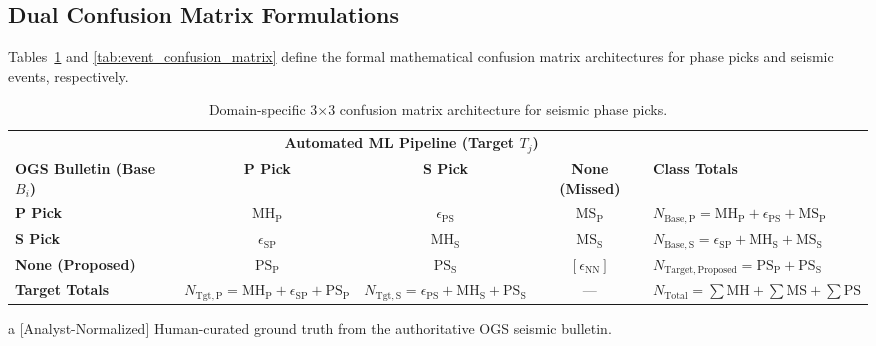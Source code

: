 \subsection{Dual Confusion Matrix Formulations}
Tables~\ref{tab:pick_confusion_matrix} and \ref{tab:event_confusion_matrix} define the formal mathematical confusion matrix architectures for phase picks and seismic events, respectively.

\begin{table}[htbp]
  \centering
  \small
  \caption{Domain-specific 3$\times$3 confusion matrix architecture for seismic phase picks.}
  \label{tab:pick_confusion_matrix}
  \begin{threeparttable}
    \begin{tabularx}{\linewidth}{l c c c X}
      \toprule
      & \multicolumn{3}{c}{\textbf{Automated ML Pipeline (Target $T_j$)}} & \\
      \cmidrule(lr){2-4}
      \textbf{OGS Bulletin (Base $B_i$)\tnote{a}} & \textbf{P Pick} & \textbf{S Pick} & \textbf{None (Missed)} & \textbf{Class Totals} \\
      \midrule
      \textbf{P Pick} & $\mathrm{MH}_{\mathrm{P}}$ & $\epsilon_{\mathrm{PS}}$ & $\mathrm{MS}_{\mathrm{P}}$ & $N_{\mathrm{Base}, \mathrm{P}} = \mathrm{MH}_{\mathrm{P}} + \epsilon_{\mathrm{PS}} + \mathrm{MS}_{\mathrm{P}}$ \\
      \textbf{S Pick} & $\epsilon_{\mathrm{SP}}$ & $\mathrm{MH}_{\mathrm{S}}$ & $\mathrm{MS}_{\mathrm{S}}$ & $N_{\mathrm{Base}, \mathrm{S}} = \epsilon_{\mathrm{SP}} + \mathrm{MH}_{\mathrm{S}} + \mathrm{MS}_{\mathrm{S}}$ \\
      \textbf{None (Proposed)\tnote{b}} & $\mathrm{PS}_{\mathrm{P}}$ & $\mathrm{PS}_{\mathrm{S}}$ & $[\epsilon_{\mathrm{NN}}]$\tnote{c} & $N_{\mathrm{Target}, \mathrm{Proposed}} = \mathrm{PS}_{\mathrm{P}} + \mathrm{PS}_{\mathrm{S}}$ \\
      \midrule
      \textbf{Target Totals} & $N_{\mathrm{Tgt}, \mathrm{P}} = \mathrm{MH}_{\mathrm{P}} + \epsilon_{\mathrm{SP}} + \mathrm{PS}_{\mathrm{P}}$ & $N_{\mathrm{Tgt}, \mathrm{S}} = \epsilon_{\mathrm{PS}} + \mathrm{MH}_{\mathrm{S}} + \mathrm{PS}_{\mathrm{S}}$ & --- & $N_{\mathrm{Total}} = \sum \mathrm{MH} + \sum \mathrm{MS} + \sum \mathrm{PS}$ \\
      \bottomrule
    \end{tabularx}
    \begin{tablenotes}[flushleft]
      \footnotesize
      \item[a] [Analyst-Normalized] Human-curated ground truth from the authoritative OGS seismic bulletin.

\end{tablenotes}
\end{threeparttable}
\end{table}
